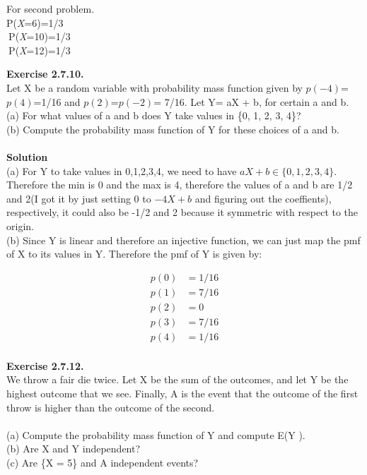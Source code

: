 \documentclass{article}
\begin{document}
\pagebreak

For second problem.\\
P(\textit{X}=6)=1/3\\
$\:$P(\textit{X}=10)=1/3\\
$\:$P(\textit{X}=12)=1/3

\textbf{Exercise 2.7.10.}
\\
Let X be a random variable with probability mass function given
by $p(-4)$=$p(4)$=1/16 and $p(2)$=$p(-2)$= 7/16. Let Y= aX + b, for certain a and
b.\\
(a) For what values of a and b does Y take values in \{0, 1, 2, 3, 4\}?\\
(b) Compute the probability mass function of Y for these choices of a and b.\\
\\
\textbf{Solution}\\
(a) For Y to take values in {0,1,2,3,4}, we need to have $aX+b \in \{0,1,2,3,4\}$. Therefore the min is 0 and the max is 4, therefore the values of a and b are 1/2 and 2(I got it by just setting 0 to $-4X + b$ and figuring out the coeffients), respectively, it could also be -1/2 and 2 because it symmetric with respect to the origin.\\
(b) Since Y is linear and therefore an injective function, we can just map the pmf of X to its values in Y. Therefore the pmf of Y is given by:

\begin{align*}
    p(0)&=1/16\\
    p(1)&=7/16\\
    p(2)&=0\\
    p(3)&=7/16\\
    p(4)&=1/16\\
\end{align*}

\pagebreak

\textbf{Exercise 2.7.12.}
\\
We throw a fair die twice. Let X be the sum of the outcomes,
and let Y be the highest outcome that we see. Finally, A is the event that the
outcome of the first throw is higher than the outcome of the second.\\ \\
(a) Compute the probability mass function of Y and compute E(Y ).\\
(b) Are X and Y independent?\\
(c) Are \{X = 5\} and A independent events?\\
\end{document}
